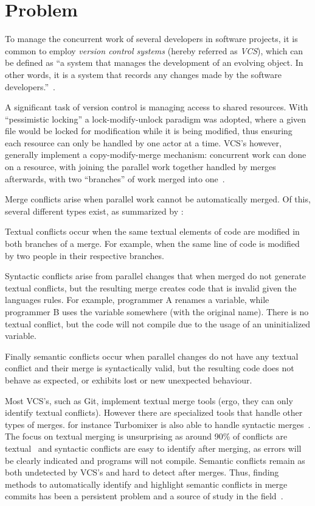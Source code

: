 \section{Problem} \label{sec:problem}

To manage the concurrent work of several developers in software projects, it is common to employ \emph{version control systems} (hereby referred as \emph{VCS}), which can be defined as ``a system that manages the development of an evolving object. In other words, it is a system that records any changes made by the software developers.''~\cite{kn:vers_review}.

A significant task of version control is managing access to shared resources.
With ``pessimistic locking'' a lock-modify-unlock paradigm was adopted, where a given file would be locked for modification while it is being modified, thus ensuring each resource can only be handled by one actor at a time. VCS's however, generally implement a copy-modify-merge mechanism: concurrent work can done on a resource, with joining the parallel work together handled by merges afterwards, with two ``branches'' of work merged into one~\cite{kn:vers_ott}.

Merge conflicts arise when parallel work cannot be automatically merged. Of this, several different types exist, as summarized by \citet{kn:tmens}:

Textual conflicts occur when the same textual elements of code are modified in both branches of a merge. For example, when the same line of code is modified by two people in their respective branches.

Syntactic conflicts arise from parallel changes that when merged do not generate textual conflicts, but the resulting merge creates code that is invalid given the languages rules. For example, programmer A renames a variable, while programmer B uses the variable somewhere (with the original name). There is no textual conflict, but the code will not compile due to the usage of an uninitialized variable.

Finally semantic conflicts occur when parallel changes do not have any textual conflict and their merge is syntactically valid, but the resulting code does not behave as expected, or exhibits lost or new unexpected behaviour.

Most VCS's, such as Git, implement textual merge tools (ergo, they can only identify textual conflicts). However there are specialized tools that handle other types of merges. for instance Turbomixer is also able to handle syntactic merges~\cite{kn:tmens}. The focus on textual merging is unsurprising as around 90\% of conflicts are textual~\cite{kn:lcsd} and syntactic conflicts are easy to identify after merging, as errors will be clearly indicated and programs will not compile.
Semantic conflicts remain as both undetected by VCS's and hard to detect after merges. Thus, finding methods to automatically identify and highlight semantic conflicts in merge commits has been a persistent problem and a source of study in the field~\cite{kn:nuno,kn:leuson,kn:leuson2}.

